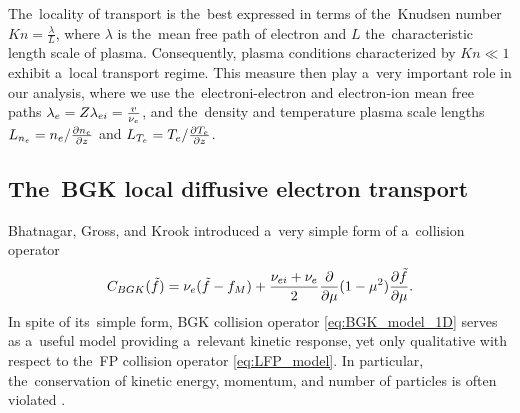 The~locality of transport is the~best expressed in terms of the~Knudsen number
$Kn=\frac{\lambda}{L}$, where $\lambda$ is the~mean free path of electron and
$L$ the~characteristic length scale of plasma. Consequently, plasma conditions
characterized by $Kn\ll1$ exhibit a~local transport regime. This measure then
play a~very important role in our analysis, where we use the~electroni-electron
and electron-ion mean free paths $\lambda_e = Z\lambda_{ei} = \frac{v}{\nu_{e}}$,
and the~density and temperature plasma scale lengths 
$L_{n_e} = n_e/\frac{\partial{n_e}}{\partial{z}}$ and $L_{T_e} = T_e/\frac{\partial{T_e}}{\partial{z}}$.

\subsection{The~BGK local diffusive electron transport}
\label{sec:BGKDiffusiveRegime}

Bhatnagar, Gross, and Krook  introduced a~very simple form
of a~collision operator \cite{BGK_1954}
\begin{equation}
  C_{BGK}(\tilde{f})
  =
  \nu_{e}(\tilde{f} - f_M)
  + \frac{\nu_{ei} + \nu_{e}}{2}
  \frac{\partial{}}{\partial{\mu}}(1 - \mu^2)\frac{\partial{\tilde{f}}}{\partial{\mu}} .
  \label{eq:BGK_model_1D}
\end{equation}
In spite of its~simple form, BGK collision operator \eqref{eq:BGK_model_1D} 
serves as a~useful model providing a~relevant kinetic response, yet only 
qualitative with respect to the~FP collision operator \eqref{eq:LFP_model}.
In particular, the~conservation of kinetic energy, momentum, 
and number of particles is often violated 
\cite{Shkarofsky_Particle_Kinetics_book_1966_24}.


